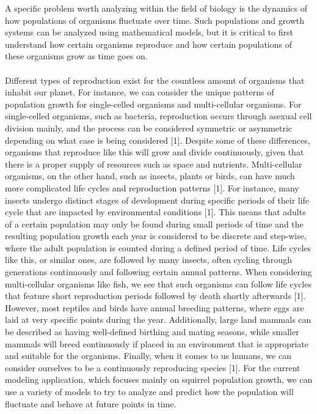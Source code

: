 \documentclass[12pt]{article}
\begin{document}
A specific problem worth analyzing within the field of biology is the dynamics of how populations of organisms fluctuate over time. Such populations and growth systems can be analyzed using mathematical models, but it is critical to first understand how certain organisms reproduce and how certain populations of these organisms grow as time goes on.\\
\\Different types of reproduction exist for the countless amount of organisms that inhabit our planet. For instance, we can consider the unique patterns of population growth for single-celled organisms and multi-cellular organisms. For single-celled organisms, such as bacteria, reproduction occurs through asexual cell division mainly, and the process can be considered symmetric or asymmetric depending on what case is being considered [1]. Despite some of these differences, organisms that reproduce like this will grow and divide continuously, given that there is a proper supply of resources such as space and nutrients. Multi-cellular organisms, on the other hand, such as insects, plants or birds, can have much more complicated life cycles and reproduction patterns [1]. For instance, many insects undergo distinct stages of development during specific periods of their life cycle that are impacted by environmental conditions [1]. This means that adults of a certain population may only be found during small periods of time and the resulting population growth each year is considered to be discrete and step-wise, where the adult population is counted during a defined period of time. Life cycles like this, or similar ones, are followed by many insects, often cycling through generations continuously and following certain annual patterns. When considering multi-cellular organisms like fish, we see that such organisms can follow life cycles that feature short reproduction periods followed by death shortly afterwards [1]. However, most reptiles and birds have annual breeding patterns, where eggs are laid at very specific points during the year. Additionally, large land mammals can be described as having well-defined birthing and mating seasons, while smaller mammals will breed continuously if placed in an environment that is appropriate and suitable for the organisms. Finally, when it comes to us humans, we can consider ourselves to be a continuously reproducing species [1]. For the current modeling application, which focuses mainly on squirrel population growth, we can use a variety of models to try to analyze and predict how the population will fluctuate and behave at future points in time.
\end{document}
